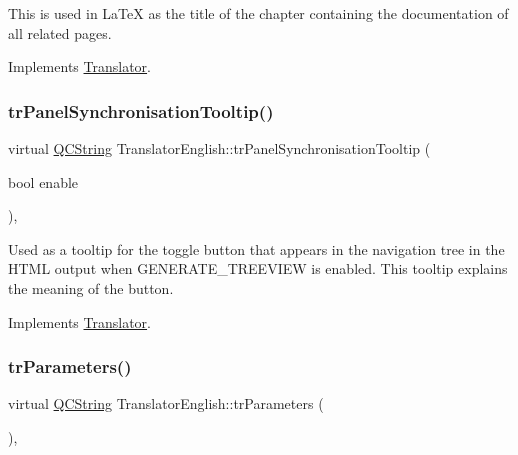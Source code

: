 This is used in La\+TeX as the title of the chapter containing the documentation of all related pages. 

Implements \mbox{\hyperlink{class_translator}{Translator}}.

\mbox{\label{class_translator_english_aedfcf8ef223b7dac08fc5732efdc88a9}} 
\subsubsection{\texorpdfstring{trPanelSynchronisationTooltip()}{trPanelSynchronisationTooltip()}}
{\footnotesize\ttfamily virtual \mbox{\hyperlink{class_q_c_string}{Q\+C\+String}} Translator\+English\+::tr\+Panel\+Synchronisation\+Tooltip (\begin{DoxyParamCaption}\item[{bool}]{enable }\end{DoxyParamCaption})\hspace{0.3cm}{\ttfamily [inline]}, {\ttfamily [virtual]}}

Used as a tooltip for the toggle button that appears in the navigation tree in the H\+T\+ML output when G\+E\+N\+E\+R\+A\+T\+E\+\_\+\+T\+R\+E\+E\+V\+I\+EW is enabled. This tooltip explains the meaning of the button. 

Implements \mbox{\hyperlink{class_translator}{Translator}}.

\mbox{\label{class_translator_english_a9703121f01956a4e9b75a16055d4f505}} 
\subsubsection{\texorpdfstring{trParameters()}{trParameters()}}
{\footnotesize\ttfamily virtual \mbox{\hyperlink{class_q_c_string}{Q\+C\+String}} Translator\+English\+::tr\+Parameters (\begin{DoxyParamCaption}{ }\end{DoxyParamCaption})\hspace{0.3cm}{\ttfamily [inline]}, {\ttfamily [virtual]}}

